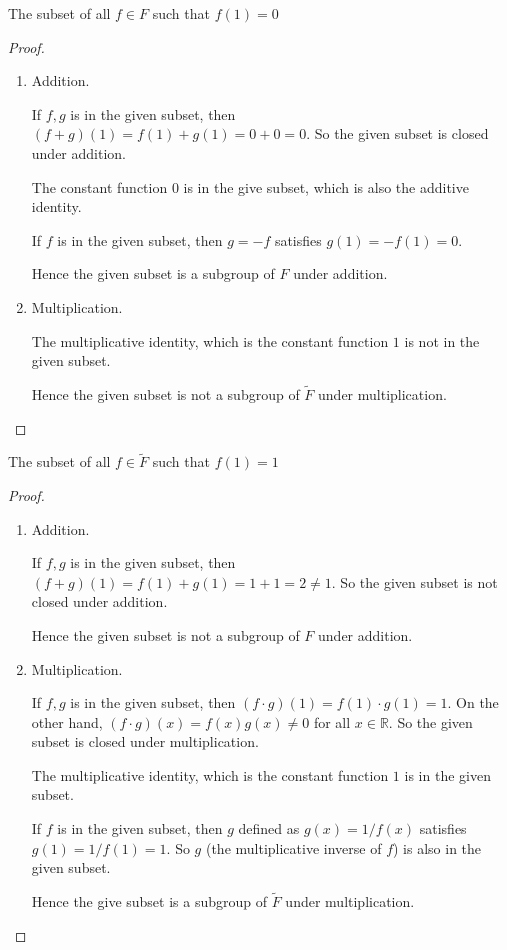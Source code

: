 \newpage
\begin{exercise}
    The subset of all $f\in F$ such that $f(1) = 0$
\end{exercise}

\begin{proof}
    \begin{enumerate}[label={(\alph*)}]
        \item Addition.

              If $f, g$ is in the given subset, then $(f + g)(1) = f(1) + g(1) = 0 + 0 = 0$. So the given subset is closed under addition.

              The constant function $0$ is in the give subset, which is also the additive identity.

              If $f$ is in the given subset, then $g = -f$ satisfies $g(1) = -f(1) = 0$.

              Hence the given subset is a subgroup of $F$ under addition.
        \item Multiplication.

              The multiplicative identity, which is the constant function $1$ is not in the given subset.

              Hence the given subset is not a subgroup of $\tilde{F}$ under multiplication.
    \end{enumerate}
\end{proof}

\newpage
\begin{exercise}
    The subset of all $f\in\tilde{F}$ such that $f(1) = 1$
\end{exercise}

\begin{proof}
    \begin{enumerate}[label={(\alph*)}]
        \item Addition.

              If $f, g$ is in the given subset, then $(f + g)(1) = f(1) + g(1) = 1 + 1 = 2\ne 1$. So the given subset is not closed under addition.

              Hence the given subset is not a subgroup of $F$ under addition.
        \item Multiplication.

              If $f, g$ is in the given subset, then $(f\cdot g)(1) = f(1)\cdot g(1) = 1$. On the other hand, $(f\cdot g)(x) = f(x)g(x) \ne 0$ for all $x\in\mathbb{R}$. So the given subset is closed under multiplication.

              The multiplicative identity, which is the constant function $1$ is in the given subset.

              If $f$ is in the given subset, then $g$ defined as $g(x) = 1/f(x)$ satisfies $g(1) = 1/f(1) = 1$. So $g$ (the multiplicative inverse of $f$) is also in the given subset.

              Hence the give subset is a subgroup of $\tilde{F}$ under multiplication.
    \end{enumerate}
\end{proof}

